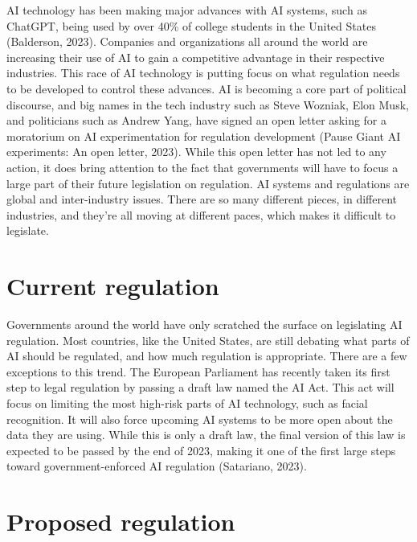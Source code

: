 \documentclass[
]{book}
\begin{document}
AI technology has been making major advances with AI systems, such as ChatGPT, being used by over 40\% of college students in the United States (Balderson, 2023). Companies and organizations all around the world are increasing their use of AI to gain a competitive advantage in their respective industries. This race of AI technology is putting focus on what regulation needs to be developed to control these advances. AI is becoming a core part of political discourse, and big names in the tech industry such as Steve Wozniak, Elon Musk, and politicians such as Andrew Yang, have signed an open letter asking for a moratorium on AI experimentation for regulation development (Pause Giant AI experiments: An open letter, 2023). While this open letter has not led to any action, it does bring attention to the fact that governments will have to focus a large part of their future legislation on regulation. AI systems and regulations are global and inter-industry issues. There are so many different pieces, in different industries, and they're all moving at different paces, which makes it difficult to legislate.

\hypertarget{current-regulation}{%
\section{Current regulation}\label{current-regulation}}

Governments around the world have only scratched the surface on legislating AI regulation. Most countries, like the United States, are still debating what parts of AI should be regulated, and how much regulation is appropriate. There are a few exceptions to this trend. The European Parliament has recently taken its first step to legal regulation by passing a draft law named the AI Act. This act will focus on limiting the most high-risk parts of AI technology, such as facial recognition. It will also force upcoming AI systems to be more open about the data they are using. While this is only a draft law, the final version of this law is expected to be passed by the end of 2023, making it one of the first large steps toward government-enforced AI regulation (Satariano, 2023).

\hypertarget{proposed-regulation}{%
\section{Proposed regulation}\label{proposed-regulation}}
\end{document}
